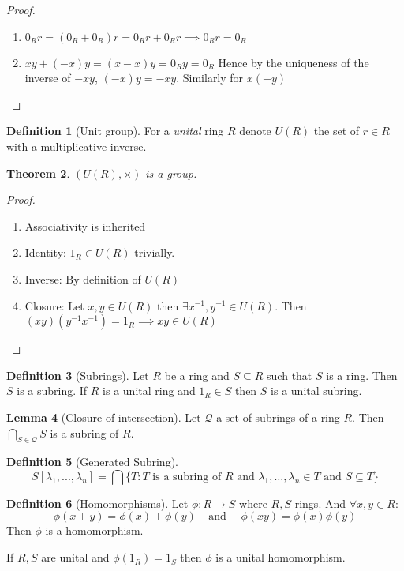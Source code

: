 \documentclass[11pt,a4paper]{article}
\newtheorem{theorem}{Theorem}[section]
\theoremstyle{definition}
\newtheorem{definition}[theorem]{Definition}
\newtheorem{lemma}[theorem]{Lemma}
\begin{document}
\begin{proof}
\begin{enumerate}
	\item $0_R r = (0_R + 0_R) r = 0_R r + 0_R r \implies 0_R r = 0_R$
	\item $xy + (-x)y = (x - x)y = 0_R y = 0_R$ Hence by the uniqueness of the inverse of $-xy$, $(-x)y = -xy$. Similarly for $x(-y)$
\end{enumerate}
\end{proof}

\begin{definition}[Unit group]
For a \emph{unital} ring $R$ denote $U(R)$ the set of $r \in R$ with a multiplicative inverse. 
\end{definition}

\begin{theorem}
$(U(R), \times)$ is a group.  
\end{theorem}

\begin{proof}
\begin{enumerate}
	\item Associativity is inherited
	\item Identity: $1_R \in U(R)$ trivially.
	\item Inverse: By definition of $U(R)$
	\item Closure: Let $x, y \in U(R)$ then $\exists x^{-1}, y^{-1} \in U(R)$. \newline Then $(xy)(y^{-1}x^{-1}) = 1_R \implies xy \in U(R)$
\end{enumerate}
\end{proof}

\begin{definition}[Subrings]
Let $R$ be a ring and $S \subseteq R$ such that $S$ is a ring. Then $S$ is a subring.
If $R$ is a unital ring and $1_R \in S$ then $S$ is a unital subring.
\end{definition}

\begin{lemma}[Closure of intersection]
Let $\mathcal{Q}$ a set of subrings of a ring $R$. Then $\bigcap\limits_{S \in \mathcal{Q}} S$ is a subring of $R$.
\end{lemma}

\begin{definition}[Generated Subring]
\[
	S[\lambda_1,..., \lambda_n] = \bigcap\{T : T \text{ is a subring of }R \text{ and } \lambda_1,\ldots, \lambda_n \in T \text{ and } S \subseteq T \}
\]
\end{definition}

\begin{definition}[Homomorphisms]
Let $\phi: R \longrightarrow S$ where $R, S$ rings. And $\forall x, y \in R$:
\[
	\phi(x + y) = \phi(x) + \phi(y) \ \ \ \ \ \text{and} \ \ \ \ \ \  \phi(xy) = \phi(x) \phi(y)
\]
Then $\phi$ is a homomorphism.

If $R, S$ are unital and $\phi(1_R) = 1_S$ then $\phi$ is a unital homomorphism.
\end{definition}
\end{document}
